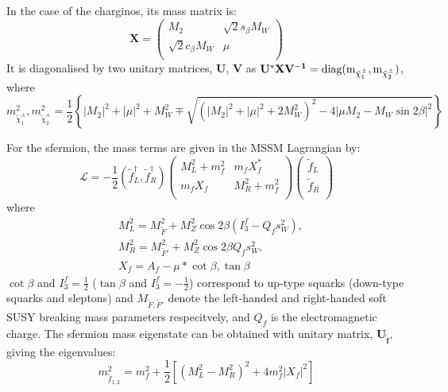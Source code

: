 In the case of the charginos, its mass matrix is:
\begin{equation}
\mathbf{X} = \left( \begin{matrix}
M_2 &  \sqrt{2}s_{\beta}M_W\\ 
\sqrt{2}c_{\beta}M_W & \mu \\
\end{matrix}\right)
\label{eq:Mchargino}
\end{equation}
It is diagonalised by two unitary matrices, $\mathbf{U}$, $\mathbf{V}$ as $\mathbf{U^*XV^{-1}} = \rm diag(m_{\tilde{\chi}_1^{\pm}},m_{\tilde{\chi}_2^{\pm}})$, where
\begin{equation}
m_{\tilde{\chi}_1^{\pm}}^2,m_{\tilde{\chi}_2^{\pm}}^2 = \frac{1}{2}\left \{ |M_2|^2 + |\mu|^2 + M_W^2 \mp \sqrt{(|M_2|^2 + |\mu|^2 + 2M_W^2)^2 -4|\mu M_2 - M_W \sin{2\beta}|^2} \right \}
\end{equation}

For the sfermion, the mass terms are given in the MSSM Lagrangian by:
\begin{equation}
\mathcal{L} = -\frac{1}{2}(\tilde{f}^\dagger_L,\tilde{f}^\dagger_R) \left( \begin{matrix}
M_L^2 + m_f^2 &  m_fX_f^*\\ 
m_fX_f & M_R^2 + m_f^2 \\
\end{matrix}\right) 
\left( \begin{matrix}
\tilde{f}_L\\ 
\tilde{f}_R \\
\end{matrix}\right) 
\end{equation}
where 
\begin{equation}
\begin{split}
& M_L^2 = M_{\tilde{F}}^2 + M_Z^2\cos{2\beta}(I_3^f - Q_fs_W^2), \\
& M_R^2 = M_{\tilde{F}'}^2 + M_Z^2\cos{2\beta}Q_fs_W^2, \\
& X_f = A_f - \mu*{\cot{\beta}, \tan{\beta}}
\end{split}
\end{equation}
$\cot{\beta}$ and $I_3^f = \frac{1}{2}$ ($\tan{\beta}$ and $I_3^f = -\frac{1}{2}$) correspond to up-type squarks (down-type squarks and sleptons) and $M_{\tilde{F},\tilde{F}'}$ denote the left-handed and right-handed soft SUSY breaking mass parameters respecitvely, and $Q_f$ is the electromagnetic charge. The sfermion mass eigenstate can be obtained with  unitary matrix, $\mathbf{U_{\tilde{f}}}$, giving the eigenvalues:
\begin{equation}
m_{\tilde{f}_{1,2}}^2 = m_f^2 + \frac{1}{2}\left [ (M_L^2 - M_R^2)^2 + 4m_f^2|X_f|^2 \right ]
\end{equation}

